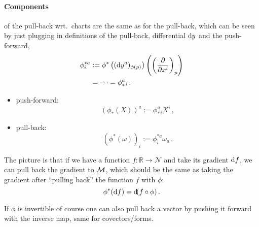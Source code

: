 \paragraph{Components} of the pull-back wrt.\ charts are the same as for the pull-back,
which can be seen by just plugging in definitions of the pull-back, differential $\operatorname{d\!} y$
and the push-forward,
\begin{align}
    \phi^{*a}_i &:= \phi^*\left( (\operatorname{d\!} y^a)_{\phi(p)} \right)\left( \left( \frac{\partial}{\partial x^i} \right)_p \right)\\
    &= \cdots = \phi_*^a{}_i\,.
\end{align}
\begin{itemize}
    \item push-forward:
        \begin{equation}
            \left( \phi_*(X) \right)^a := \phi_*^a{}_i X^i\,,
        \end{equation}
    \item pull-back:
        \begin{equation}
            \left( \phi^*(\omega) \right)_i := \phi^{*a}_i \omega_a\,.
        \end{equation}
\end{itemize}
\begin{note}
    The picture is that if we have a function $f: \mathbb{R}\to \mathcal{N}$
    and take its gradient $\operatorname{d\!} f$, we can pull back the gradient to $\mathcal{M}$,
    which should be the same as taking the gradient after ``pulling back''
    the function $f$ with $\phi$:
    \begin{equation}
        \phi^*(\operatorname{d\!} f) = \operatorname{d\!} (f\circ \phi)\,.
    \end{equation}
\end{note}
\begin{center}
\end{center}

\begin{note}
    If $\phi$ is invertible of course one can also pull back a vector
    by pushing it forward with the inverse map, same for covectors/forms. 
\end{note}

